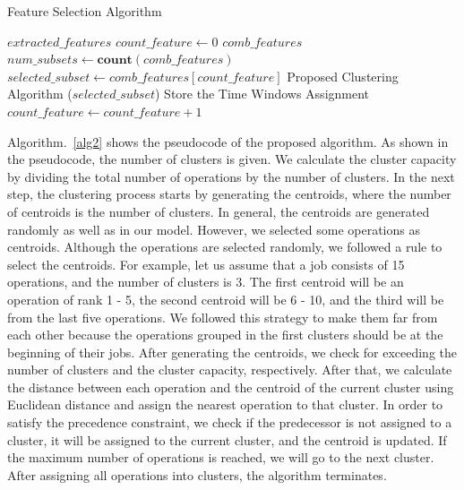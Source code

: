 \documentclass[runningheads]{llncs}
\begin{document}
\begin{algorithm}
\caption{Feature Selection Algorithm}\label{alg1}
\begin{algorithmic}
\Require $extracted\_features$
\State $count\_feature \gets 0$
\State $comb\_features$ 
\State $num\_subsets \gets \textbf{count}(comb\_features)$
	\State $selected\_subset \gets comb\_features[count\_feature]$
	\State Proposed Clustering Algorithm ($selected\_subset$)  %
	\State Store the Time Windows Assignment
	\State $count\_feature \gets count\_feature + 1$
\EndWhile

\end{algorithmic}
\end{algorithm}

Algorithm.~\ref{alg2} shows the pseudocode of the proposed algorithm. As shown in the pseudocode, the number of clusters is given. We calculate the cluster capacity by dividing the total number of operations by the number of clusters. In the next step, the clustering process starts by generating the centroids, where the number of centroids is the number of clusters. In general, the centroids are generated randomly as well as in our model. However, we selected some operations as centroids. Although the operations are selected randomly, we followed a rule to select the centroids. For example, let us assume that a job consists of 15 operations, and the number of clusters is $3$. The first centroid will be an operation of rank 1 - 5, the second centroid will be 6 - 10, and the third will be from the last five operations. We followed this strategy to make them far from each other because the operations grouped in the first clusters should be at the beginning of their jobs. After generating the centroids, we check for exceeding the number of clusters and the cluster capacity, respectively. After that, we calculate the distance between each operation and the centroid of the current cluster using Euclidean distance and assign the nearest operation to that cluster. In order to satisfy the precedence constraint, we check if the predecessor is not assigned to a cluster, it will be assigned to the current cluster, and the centroid is updated. If the maximum number of operations is reached, we will go to the next cluster. After assigning all operations into clusters, the algorithm terminates.
\end{document}
